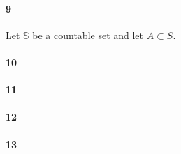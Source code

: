 \documentclass{article}
\begin{document}
\paragraph{9} Let $\mathbb{S}$ be a countable set and let $A \subset S$.
\paragraph{10}
\paragraph{11}
\paragraph{12}
\paragraph{13}
\end{document}
